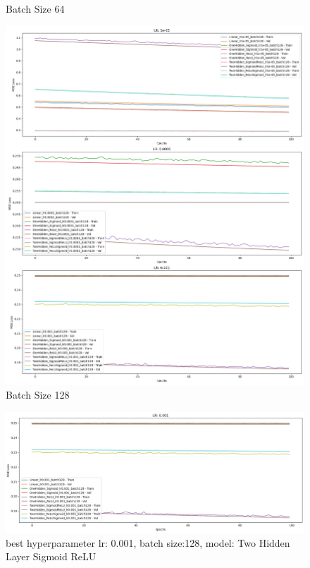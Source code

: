 \begin{figure}[!htbp]
\begin{minipage}{0.32\linewidth}
        \caption{Batch Size 64}
    \end{minipage}
    \hfill
    \begin{minipage}{0.32\linewidth}
        \includegraphics[width=\linewidth]{mse_model_losses_batch128.png}
        \caption{Batch Size 128}
    \end{minipage}
\end{figure}

\begin{figure}[!htbp]
    \centering\includegraphics[width=1\linewidth]{MSE_best.jpg}
    \caption[short]{best hyperparameter lr: 0.001, batch size:128, model: Two Hidden Layer Sigmoid ReLU}
\end{figure}

